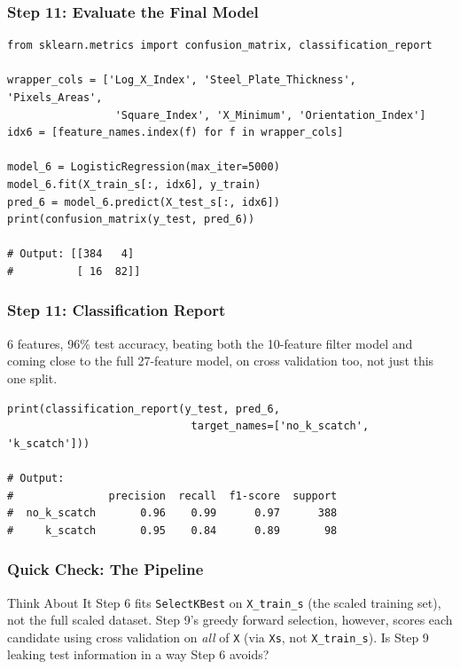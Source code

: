 \begin{frame}[fragile]\frametitle{Step 11: Evaluate the Final Model}
\begin{lstlisting}
from sklearn.metrics import confusion_matrix, classification_report

wrapper_cols = ['Log_X_Index', 'Steel_Plate_Thickness', 'Pixels_Areas',
                 'Square_Index', 'X_Minimum', 'Orientation_Index']
idx6 = [feature_names.index(f) for f in wrapper_cols]

model_6 = LogisticRegression(max_iter=5000)
model_6.fit(X_train_s[:, idx6], y_train)
pred_6 = model_6.predict(X_test_s[:, idx6])
print(confusion_matrix(y_test, pred_6))

# Output: [[384   4]
#          [ 16  82]]
\end{lstlisting}
\end{frame}

\begin{frame}[fragile]\frametitle{Step 11: Classification Report}
6 features, 96\% test accuracy, beating both the 10-feature filter model and coming close to the full 27-feature model, on cross validation too, not just this one split.
\begin{lstlisting}
print(classification_report(y_test, pred_6,
                             target_names=['no_k_scatch', 'k_scatch']))

# Output:
#               precision  recall  f1-score  support
#  no_k_scatch       0.96    0.99      0.97      388
#     k_scatch       0.95    0.84      0.89       98
\end{lstlisting}
\end{frame}

\begin{frame}[fragile]\frametitle{Quick Check: The Pipeline}
\begin{block}{Think About It}
Step 6 fits \texttt{SelectKBest} on \texttt{X\_train\_s} (the scaled training set), not the full scaled dataset. Step 9's greedy forward selection, however, scores each candidate using cross validation on \emph{all} of \texttt{X} (via \texttt{Xs}, not \texttt{X\_train\_s}). Is Step 9 leaking test information in a way Step 6 avoids?
\end{block}
\end{frame}

